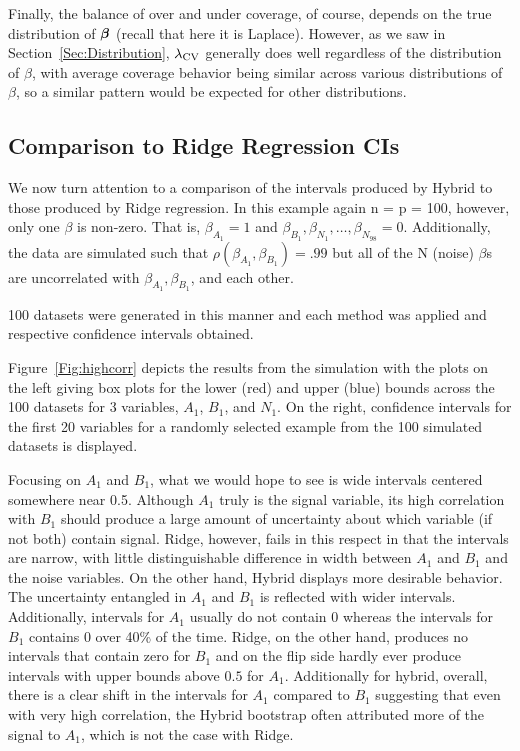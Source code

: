 Finally, the balance of over and under coverage, of course, depends on the true distribution of $\boldsymbol{\beta}$ (recall that here it is Laplace). However, as we saw in Section~\ref{Sec:Distribution}, $\lambda_{\textrm{CV}}$ generally does well regardless of the distribution of $\beta$, with average coverage behavior being similar across various distributions of $\beta$, so a similar pattern would be expected for other distributions.

\subsection{Comparison to Ridge Regression CIs}\label{Sec:Ridge}

We now turn attention to a comparison of the intervals produced by Hybrid to those produced by Ridge regression. In this example again n = p = 100, however, only one $\beta$ is non-zero. That is, $\beta_{A_1} = 1$ and $\beta_{B_1}, \beta_{N_1}, \ldots, \beta_{N_{98}} = 0$. Additionally, the data are simulated such that $\rho(\beta_{A_1}, \beta_{B_1}) = .99$ but all of the N (noise) $\beta$s are uncorrelated with $\beta_{A_1}, \beta_{B_1}$, and each other.

100 datasets were generated in this manner and each method was applied and respective confidence intervals obtained.

Figure~\ref{Fig:highcorr} depicts the results from the simulation with the plots on the left giving box plots for the lower (red) and upper (blue) bounds across the 100 datasets for 3 variables, $A_1$, $B_1$, and $N_1$. On the right, confidence intervals for the first 20 variables for a randomly selected example from the 100 simulated datasets is displayed.

Focusing on $A_1$ and $B_1$, what we would hope to see is wide intervals centered somewhere near 0.5. Although $A_1$ truly is the signal variable, its high correlation with $B_1$ should produce a large amount of uncertainty about which variable (if not both) contain signal. Ridge, however, fails in this respect in that the intervals are narrow, with little distinguishable difference in width between $A_1$ and $B_1$ and the noise variables. On the other hand, Hybrid displays more desirable behavior. The uncertainty entangled in $A_1$ and $B_1$ is reflected with wider intervals. Additionally, intervals for $A_1$ usually do not contain 0 whereas the intervals for $B_1$ contains 0 over 40\% of the time. Ridge, on the other hand, produces no intervals that contain zero for $B_1$ and on the flip side hardly ever produce intervals with upper bounds above $0.5$ for $A_1$. Additionally for hybrid, overall, there is a clear shift in the intervals for $A_1$ compared to $B_1$ suggesting that even with very high correlation, the Hybrid bootstrap often attributed more of the signal to $A_1$, which is not the case with Ridge.

